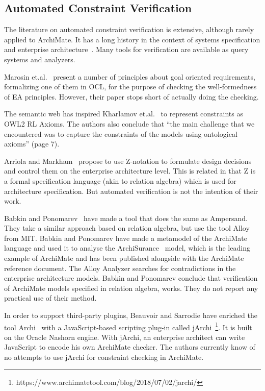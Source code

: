 \documentclass[sn-vancouver]{sn-jnl}%
\theoremstyle{thmstyleone}%
\theoremstyle{thmstyletwo}%
\theoremstyle{thmstylethree}%
\begin{document}
\subsection{Automated Constraint Verification}\label{Verif}
The literature on automated constraint verification is extensive, although rarely applied to ArchiMate.
It has a long history in the context of systems specification and enterprise architecture~\cite{chapurlat2008verification}.
Many tools for verification are available as query systems and analyzers.

Marosin et.al.~\cite{marosin2016principle} present a number of principles about goal oriented requirements, formalizing one of them in OCL,
for the purpose of checking the well-formedness of EA principles. However, their paper stops short of actually doing the checking.

The semantic web has inspired Kharlamov et.al.~\cite{kharlamov2016capturing} to represent constraints as OWL2 RL Axioms.
The authors also conclude that ``the main challenge that we encountered was to capture the constraints of the models using ontological axioms'' (page 7).

Arriola and Markham~\cite{arriola2018towards} propose to use Z-notation to formulate design decisions and control them on the enterprise architecture level.
This is related in that Z is a formal specification language (akin to relation algebra) which is used for architecture specification.
But automated verification is not the intention of their work.

Babkin and Ponomarev~\cite{babkin2017analysis} have made a tool that does the same as Ampersand.
They take a similar approach based on relation algebra, but use the tool Alloy~\cite{Alloy2006} from MIT.
Babkin and Ponomarev have made a metamodel of the ArchiMate language and used it to analyse the ArchiSurance~\cite{ArchiSurance2016} model,
which is the leading example of ArchiMate and has been published alongside with the ArchiMate reference document.
The Alloy Analyzer searches for contradictions in the enterprise architecture models.
Babkin and Ponomarev conclude that verification of ArchiMate models specified in relation algebra, works.
They do not report any practical use of their method.

In order to support third-party plugins,
Beauvoir and Sarrodie have enriched the tool Archi~\cite{beauvoir2019archi} with a JavaScript-based scripting plug-in called jArchi~\footnote{https://www.archimatetool.com/blog/2018/07/02/jarchi/}.
It is built on the Oracle Nashorn engine.
With jArchi, an enterprise architect can write JavaScript to encode his own ArchiMate checker.
The authors currently know of no attempts to use jArchi for constraint checking in ArchiMate.
\end{document}
